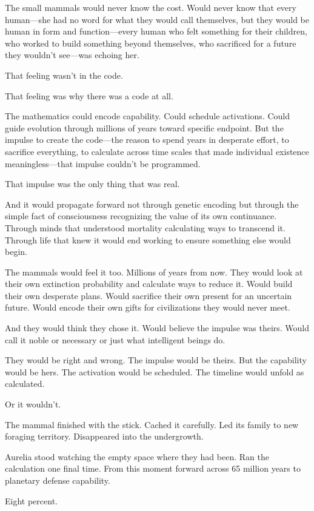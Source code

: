 The small mammals would never know the cost. Would never know that every human—she had no word for what they would call themselves, but they would be human in form and function—every human who felt something for their children, who worked to build something beyond themselves, who sacrificed for a future they wouldn't see—was echoing her.

That feeling wasn't in the code.

That feeling was why there was a code at all.

The mathematics could encode capability. Could schedule activations. Could guide evolution through millions of years toward specific endpoint. But the impulse to create the code—the reason to spend years in desperate effort, to sacrifice everything, to calculate across time scales that made individual existence meaningless—that impulse couldn't be programmed.

That impulse was the only thing that was real.

And it would propagate forward not through genetic encoding but through the simple fact of consciousness recognizing the value of its own continuance. Through minds that understood mortality calculating ways to transcend it. Through life that knew it would end working to ensure something else would begin.

The mammals would feel it too. Millions of years from now. They would look at their own extinction probability and calculate ways to reduce it. Would build their own desperate plans. Would sacrifice their own present for an uncertain future. Would encode their own gifts for civilizations they would never meet.

And they would think they chose it. Would believe the impulse was theirs. Would call it noble or necessary or just what intelligent beings do.

They would be right and wrong. The impulse would be theirs. But the capability would be hers. The activation would be scheduled. The timeline would unfold as calculated.

Or it wouldn't.

The mammal finished with the stick. Cached it carefully. Led its family to new foraging territory. Disappeared into the undergrowth.

Aurelia stood watching the empty space where they had been. Ran the calculation one final time. From this moment forward across 65 million years to planetary defense capability.

Eight percent.

